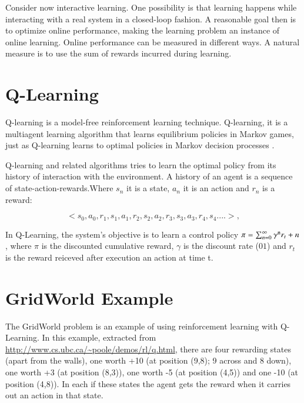 Consider now interactive learning. One possibility is that learning happens while interacting
with a real system in a closed-loop fashion. A reasonable goal then is to optimize online performance,
making the learning problem an instance of online learning. Online performance
can be measured in different ways. A natural measure is to use the sum of rewards incurred
during learning. 




\section{Q-Learning}

Q-learning is a model-free reinforcement learning technique. Q-learning, it is a multiagent learning algorithm that learns equilibrium policies in Markov games, just as Q-learning learns to optimal policies in Markov decision processes \cite{Greenwald2003}. 

Q-learning and related algorithms tries to learn the optimal policy from its history of interaction with the environment. A history of an agent is a sequence of state-action-rewards.Where $s_{n}$ it is a state, $a_{n}$ it is an action and $r_{n}$ is a reward:

\begin{equation}
<s_{0},a_{0},r_{1},s_{1},a_{1},r_{2},s_{2},a_{2},r_{3},s_{3},a_{3},r_{4},s_{4}....>,
\end{equation}


In Q-Learning, the system's objective is to learn a control policy $\pi = \sum_{n=0}^{\infty} \gamma\textsuperscript{n}  r_{t}+n $, where $\pi$  is the discounted cumulative reward, $\gamma$ is the discount rate ($01$) and $r_{t}$ is the reward reiceved after execution an action at time t.

\section{GridWorld Example}

The GridWorld problem is an example of using reinforcement learning with Q-Learning. In this example, extracted from \url{http://www.cs.ubc.ca/~poole/demos/rl/q.html}, there are four rewarding states (apart from the walls), one worth +10 (at position (9,8); 9 across and 8 down), one worth +3 (at position (8,3)), one worth -5 (at position (4,5)) and one -10 (at position (4,8)). In each if these states the agent gets the reward when it carries out an action in that state.

